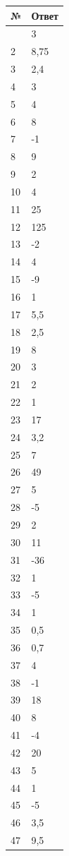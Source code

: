 {\def\LTcaptype{none} %
\begin{longtable}[]{@{}ll@{}}
\toprule\noalign{}
№ & Ответ \\
\midrule\noalign{}
\endhead
\bottomrule\noalign{}
\endlastfoot
1 & 3 \\
2 & 8,75 \\
3 & 2,4 \\
4 & 3 \\
5 & 4 \\
6 & 8 \\
7 & -1 \\
8 & 9 \\
9 & 2 \\
10 & 4 \\
11 & 25 \\
12 & 125 \\
13 & -2 \\
14 & 4 \\
15 & -9 \\
16 & 1 \\
17 & 5,5 \\
18 & 2,5 \\
19 & 8 \\
20 & 3 \\
21 & 2 \\
22 & 1 \\
23 & 17 \\
24 & 3,2 \\
25 & 7 \\
26 & 49 \\
27 & 5 \\
28 & -5 \\
29 & 2 \\
30 & 11 \\
31 & -36 \\
32 & 1 \\
33 & -5 \\
34 & 1 \\
35 & 0,5 \\
36 & 0,7 \\
37 & 4 \\
38 & -1 \\
39 & 18 \\
40 & 8 \\
41 & -4 \\
42 & 20 \\
43 & 5 \\
44 & 1 \\
45 & -5 \\
46 & 3,5 \\
47 & 9,5 \\

\end{longtable}}

